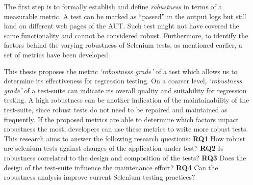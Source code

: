 



The first step is to formally establish and define \textit{robustness} in terms of a measurable metric. A test can be marked as ``passed'' in the output logs but still land on different web pages of the AUT. Such test might not have covered the same functionality and cannot be considered robust. Furthermore, to identify the factors behind the varying robustness of Selenium tests, as mentioned earlier, a set of metrics have been developed. 

This thesis proposes the metric \textit{`robustness grade'} of a test which allows us to determine its effectiveness for regression testing. On a coarser level, \textit{`robustness grade'} of a test-suite can indicate its overall quality and suitability for regression testing. A high robustness can be another indication of the maintainability of the test-suite, since robust tests do not need to be repaired and maintained as frequently. If the proposed metrics are able to determine which factors impact robustness the most, developers can use these metrics to write more robust tests. This research aims to answer the following research questions:
\newline
{\bfseries RQ1} How robust are selenium tests against changes of the application under test? \newline
{\bfseries RQ2} Is robustness correlated to the design and composition of the tests?\newline
{\bfseries RQ3} Does the design of the test-suite influence the maintenance effort?\newline
{\bfseries RQ4} Can the robustness analysis improve current Selenium testing practices?\newline

